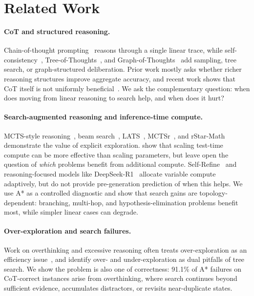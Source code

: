 \documentclass[10pt]{article}
\begin{document}
\section{Related Work}
\label{sec:related}

\paragraph{CoT and structured reasoning.}
Chain-of-thought prompting~\cite{wei2022chain} reasons through a single linear trace, while self-consistency~\cite{wang2022self}, Tree-of-Thoughts~\cite{yao2024tree}, and Graph-of-Thoughts~\cite{besta2024graph} add sampling, tree search, or graph-structured deliberation. Prior work mostly asks whether richer reasoning structures improve aggregate accuracy, and recent work shows that CoT itself is not uniformly beneficial~\cite{meincke2025cot}. We ask the complementary question: when does moving from linear reasoning to search help, and when does it hurt?

\paragraph{Search-augmented reasoning and inference-time compute.}
MCTS-style reasoning~\cite{hao2023reasoning}, beam search~\cite{xie2024self}, LATS~\cite{zhou2024lats}, MCTSr~\cite{zhang2024mctsrmath}, and rStar-Math~\cite{guan2025rstar} demonstrate the value of explicit exploration. \cite{snell2024scaling} show that scaling test-time compute can be more effective than scaling parameters, but leave open the question of \emph{which} problems benefit from additional compute. Self-Refine~\cite{madaan2023selfrefine} and reasoning-focused models like DeepSeek-R1~\cite{deepseekr1} allocate variable compute adaptively, but do not provide pre-generation prediction of when this helps. We use A* as a controlled diagnostic and show that search gains are topology-dependent: branching, multi-hop, and hypothesis-elimination problems benefit most, while simpler linear cases can degrade.

\paragraph{Over-exploration and search failures.}
Work on overthinking and excessive reasoning often treats over-exploration as an efficiency issue~\cite{sui2025overthinking,wang2025fetch,ma2025cotvalve}, and \cite{wang-etal-2025-dont} identify over- and under-exploration as dual pitfalls of tree search. We show the problem is also one of correctness: 91.1\% of A* failures on CoT-correct instances arise from overthinking, where search continues beyond sufficient evidence, accumulates distractors, or revisits near-duplicate states.
\end{document}
